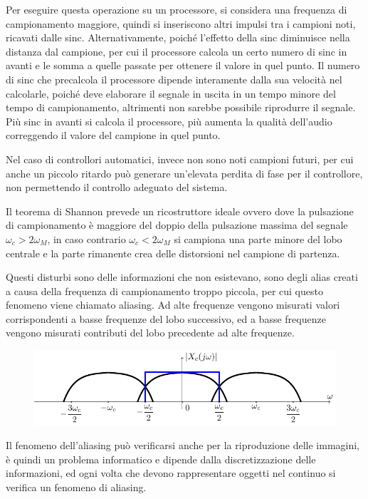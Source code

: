 \documentclass{article}
\numberwithin{equation}{subsection}
\begin{document}
Per eseguire questa operazione su un 
processore, si considera una frequenza di campionamento maggiore, quindi si inseriscono altri impulsi tra i campioni noti, ricavati dalle sinc. Alternativamente, poiché 
l'effetto della sinc diminuisce nella distanza dal campione, per cui il processore calcola un certo numero di sinc in avanti e le somma a quelle passate per ottenere 
il valore in quel punto. Il numero di sinc che precalcola il processore dipende interamente dalla sua velocità nel calcolarle, poiché deve elaborare il segnale in uscita 
in un tempo minore del tempo di campionamento, altrimenti non sarebbe possibile riprodurre il segnale. Più sinc in avanti si calcola il 
processore, più aumenta la qualità dell'audio correggendo il valore del campione in quel punto. 

Nel caso di controllori automatici, invece non sono noti campioni futuri, per cui anche un piccolo ritardo può generare un'elevata perdita di fase per il controllore, 
non permettendo il controllo adeguato del sistema. 


Il teorema di Shannon prevede un ricostruttore ideale ovvero dove la pulsazione di campionamento è maggiore del doppio della pulsazione massima del segnale 
$\omega_c>2\omega_M$, in caso contrario $\omega_c<2\omega_M$ si campiona una parte minore del 
lobo centrale e la parte rimanente crea delle distorsioni nel campione di partenza. 


Questi disturbi sono delle informazioni che non esistevano, sono degli alias creati a causa 
della frequenza di campionamento troppo piccola, per cui questo fenomeno viene chiamato aliasing. Ad alte frequenze vengono misurati valori corrispondenti a basse 
frequenze del lobo successivo, ed a basse frequenze vengono misurati contributi del lobo precedente ad alte frequenze. 

\begin{figure}[H]%
    \centering
    \includegraphics{aliasing.pdf}%
\end{figure}

Il fenomeno dell'aliasing può verificarsi anche per la riproduzione delle immagini, è quindi un problema informatico e dipende dalla discretizzazione delle 
informazioni, ed ogni volta che devono rappresentare oggetti nel continuo si verifica un fenomeno di aliasing. 
\end{document}
